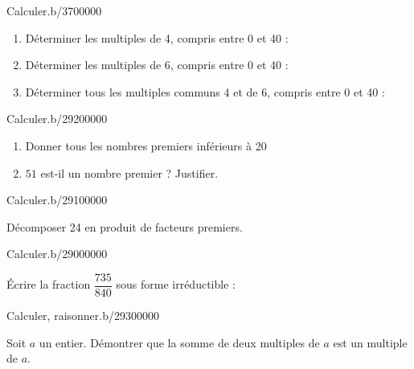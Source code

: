 \begin{pageAD} 
 


\begin{ExoCad}{Calculer.}{b/37}{0}{0}{0}{0}{0}
\begin{enumerate}
\item Déterminer les multiples de 4, compris entre 0 et 40 :
\item Déterminer les multiples de 6, compris entre 0 et 40 :
\item Déterminer tous les multiples communs 4 et de 6, compris entre 0 et 40 :
\end{enumerate}

\end{ExoCad}



\begin{ExoCad}{Calculer.}{b/292}{0}{0}{0}{0}{0}
\begin{enumerate}
\item Donner tous les nombres premiers inférieurs à 20 
\item $51$ est-il un nombre premier ? Justifier. 
\end{enumerate}
\end{ExoCad}


\begin{ExoCad}{Calculer.}{b/291}{0}{0}{0}{0}{0}

Décomposer 24 en produit de facteurs premiers.


\end{ExoCad}



\begin{ExoCad}{Calculer.}{b/290}{0}{0}{0}{0}{0}

Écrire la fraction $\dfrac{735}{840}$ sous forme irréductible : 


\end{ExoCad}


\begin{ExoCad}{Calculer, raisonner.}{b/293}{0}{0}{0}{0}{0}

Soit $a$ un entier. Démontrer que la somme de deux multiples de $a$ est un multiple de $a$. 

\end{ExoCad}



\end{pageAD}

